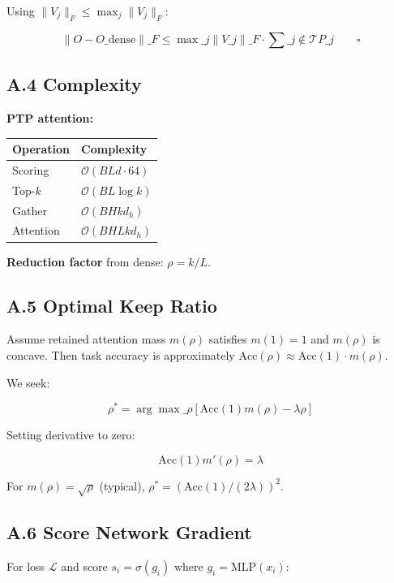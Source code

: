 Using $\|V_j\|_F \leq \max_j \|V_j\|_F$:

\[
\|O - O\_\text{dense}\|\_F \leq \max\_j \|V\_j\|\_F \cdot \sum\_{j \notin \mathcal{T}} P\_j \qquad \square
\]

\subsection{A.4 Complexity}

\textbf{PTP attention:}

\begin{table}[H]
\centering
\small
\begin{tabular}{ll}
\toprule
\textbf{Operation} & \textbf{Complexity} \\
\midrule
Scoring & $\mathcal{O}(B L d \cdot 64)$ \\
Top-$k$ & $\mathcal{O}(B L \log k)$ \\
Gather & $\mathcal{O}(B H k d_h)$ \\
Attention & $\mathcal{O}(B H L k d_h)$ \\
\bottomrule
\end{tabular}
\end{table}

\textbf{Reduction factor} from dense: $\rho = k / L$.

\subsection{A.5 Optimal Keep Ratio}

Assume retained attention mass $m(\rho)$ satisfies $m(1) = 1$ and 
$m(\rho)$ is concave. Then task accuracy is approximately 
$\text{Acc}(\rho) \approx \text{Acc}(1) \cdot m(\rho)$.

We seek:

\[
\rho^* = \arg\max\_\rho \left[\text{Acc}(1) m(\rho) - \lambda \rho\right]
\tag{A.2}
\]

Setting derivative to zero:

\[
\text{Acc}(1) m'(\rho) = \lambda
\tag{A.3}
\]

For $m(\rho) = \sqrt{\rho}$ (typical), $\rho^* = (\text{Acc}(1) / (2\lambda))^2$.

\subsection{A.6 Score Network Gradient}

For loss $\mathcal{L}$ and score $s_i = \sigma(g_i)$ where 
$g_i = \text{MLP}(x_i)$:

